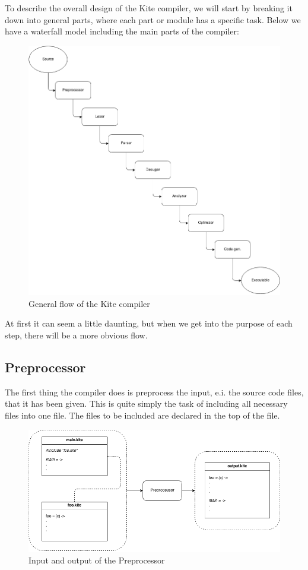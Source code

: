 To describe the overall design of the Kite compiler, we will start by
breaking it down into general parts, where each part or module has a
specific task. Below we have a waterfall model including the main
parts of the compiler:

\begin{figure}[H]
  \label{fig:flow}
  \center
  \includegraphics[scale=0.45]{images/flow.png}
  \caption{General flow of the Kite compiler}
\end{figure}

At first it can seem a little daunting, but when we get into the
purpose of each step, there will be a more obvious flow.

\subsection{Preprocessor}
The first thing the compiler does is preprocess the input, e.i. the
source code files, that it has been given. This is quite simply the
task of including all necessary files into one file. The files to be
included are declared in the top of the file.

\begin{figure}[H]
  \label{fig:preprocessor}
  \center
  \includegraphics[scale=0.45]{images/preprocessor.png}
  \caption{Input and output of the Preprocessor}
\end{figure}

